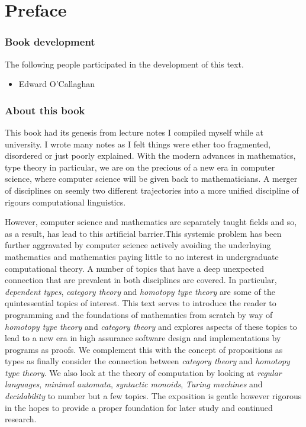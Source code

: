 %
%

\chapter*{Preface}
\label{cha:preface}


\subsection*{Book development}
The following people participated in the development of this text.

\begin{multicols}{2}{
\begin{itemize}
\item[] Edward O'Callaghan
\end{itemize}
}
\end{multicols}


\subsection*{About this book}


This book had its genesis from lecture notes I compiled myself while at
university. I wrote many notes as I felt things were ether too fragmented,
disordered or just poorly explained. With the modern advances in mathematics,
type theory in particular, we are on the precious of a new era in computer
science, where computer science will be given back to mathematicians. A merger
of disciplines on seemly two different trajectories into a more unified
discipline of rigours computational linguistics.

However, computer science and mathematics are separately taught fields and so,
as a result, has lead to this artificial barrier.This systemic problem has
been further aggravated by computer science actively avoiding the underlaying
mathematics and mathematics paying little to no interest in undergraduate
computational theory. A number of topics that have a deep unexpected connection
that are prevalent in both disciplines are covered. In particular,
\emph{dependent types}, \emph{category theory} and \emph{homotopy type theory}
are some of the quintessential topics of interest. This text serves to
introduce the reader to programming and the foundations of mathematics from
scratch by way of \emph{homotopy type theory} and \emph{category theory} and
explores aspects of these topics to lead to a new era in high assurance
software design and implementations by programs as proofs. We complement this
with the concept of propositions as types as finally consider the connection
between \emph{category theory} and \emph{homotopy type theory}. We also look
at the theory of computation by looking at \emph{regular languages},
\emph{minimal automata}, \emph{syntactic monoids}, \emph{Turing machines} and
\emph{decidability} to number but a few topics. The exposition is gentle
however rigorous in the hopes to provide a proper foundation for later study
and continued research.


